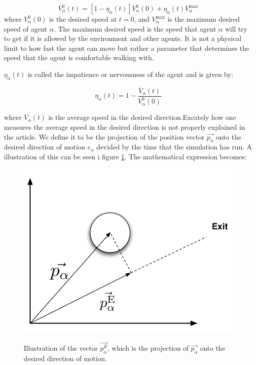 \begin{equation}\label{v0eta}
    V_{\alpha}^{0}\left( t \right) = \left[ 1 - \eta_{\alpha} \left( t \right) \right] 
    V_{\alpha}^{0} \left( 0 \right) +
    \eta_{\alpha} \left( t \right)V_{\alpha}^{\text{max}}
\end{equation}
where $V_{\alpha}^{0} \left( 0 \right)$ is the desired speed at $ t=0 $, and 
$V_{\alpha}^{\text{max}}$ is the maximum desired speed of agent $\alpha$. The 
maximum desired speed is the speed that agent $\alpha$ will try to get if it 
is allowed by the environment and other agents. It is not a physical limit to 
how fast the agent can move but rather a parameter that determines the speed 
that the agent is comfortable walking with. 

$\eta_{\alpha} \left( t \right)$ is called the impatience or nervousness of 
the agent and is given by:

\begin{equation}\label{eta}
	\eta_{\alpha} \left( t \right) =
    1 - \frac{\overline{V}_{\alpha} \left( t \right)}
             {V_{\alpha}^{0} \left( 0 \right)}
\end{equation}

where $\overline{V}_{\alpha}\left( t \right)$ is the average speed in the 
desired direction.Excately how one measures the average speed in the desired 
direction is not properly explained in the article. We define it to be the 
projection of the position vector $ \vec{p_{\alpha}} $ onto the desired direction 
of motion $e_{\alpha}$ devided by the time that the simulation has run. A 
illustration of this can be seen i figure \ref{impatience}. The mathematical 
expression becomes:

\begin{figure}[ht]
    \centering
    {\includegraphics[scale=0.35]{Figures/NotationOfAgent2.pdf}} 
    \caption{Illustration of the vector $ \vec{p_{\alpha}^{E}}$, which is the 
    projection of $ \vec{p_{\alpha}} $ onto the desired direction of motion.}
    \label{impatience}
\end{figure}

